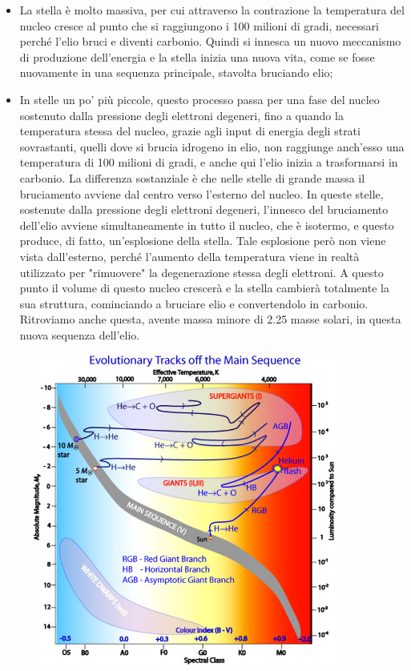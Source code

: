\begin{itemize}
    \item La stella è molto massiva, per cui attraverso la contrazione la temperatura del nucleo cresce al punto che si raggiungono i 100 milioni di gradi, necessari perché l'elio bruci e diventi carbonio. Quindi si innesca un nuovo meccanismo di produzione dell'energia e la stella inizia una nuova vita, come se fosse nuovamente in una sequenza principale, stavolta bruciando elio;
    \item In stelle un po' più piccole, questo processo passa per una fase del nucleo sostenuto dalla pressione degli elettroni degeneri, fino a quando la temperatura stessa del nucleo, grazie agli input di energia degli strati sovrastanti, quelli dove si brucia idrogeno in elio, non raggiunge anch'esso una temperatura di 100 milioni di gradi, e anche qui l'elio inizia a trasformarsi in carbonio. La differenza sostanziale è che nelle stelle di grande massa il bruciamento avviene dal centro verso l'esterno del nucleo. In queste stelle, sostenute dalla pressione degli elettroni degeneri, l'innesco del bruciamento dell'elio avviene simultaneamente in tutto il nucleo, che è isotermo, e questo produce, di fatto, un'esplosione della stella. Tale esplosione però non viene vista dall'esterno, perché l'aumento della temperatura viene in realtà utilizzato per "rimuovere" la degenerazione stessa degli elettroni. A questo punto il volume di questo nucleo crescerà e la stella cambierà totalmente la sua struttura, cominciando a bruciare elio e convertendolo in carbonio. Ritroviamo anche questa, avente massa minore di 2.25 masse solari, in questa nuova sequenza dell'elio. 
\end{itemize}

\begin{figure}[H]
    \centering
    \includegraphics[width=10cm]{lezione 28 novembre/mainsequencehelium.png}
    \label{fig:lezione 28 novembre/mainsequencehelium}
\end{figure}


